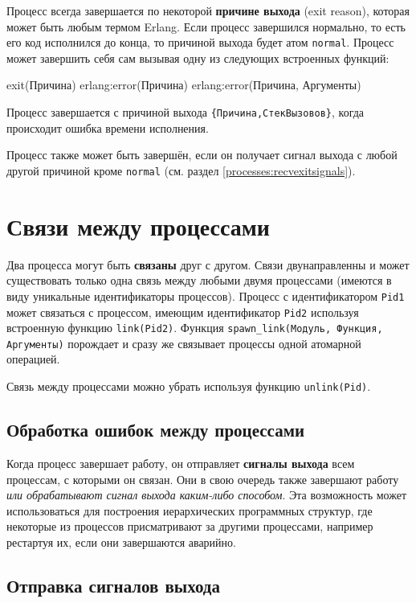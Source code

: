 Процесс всегда завершается по некоторой \textbf{причине выхода} (exit reason), 
которая может быть любым термом Erlang.  Если процесс завершился нормально, то 
есть его код исполнился до конца, то причиной выхода будет атом \texttt{normal}.
Процесс может завершить себя сам вызывая одну из следующих встроенных функций:

\begin{erlangru}
exit(Причина)
erlang:error(Причина)
erlang:error(Причина, Аргументы)
\end{erlangru}

Процесс завершается с причиной выхода \texttt{\{Причина,СтекВызовов\}}, когда 
происходит ошибка времени исполнения.

Процесс также может быть завершён, если он получает сигнал выхода с любой другой
причиной кроме \texttt{normal} (см. раздел \ref{processes:recvexitsignals}).


\section{Связи между процессами}
\label{processes:links}

Два процесса могут быть \textbf{связаны} друг с другом. Связи двунаправленны и
может существовать только одна связь между любыми двумя процессами (имеются в 
виду уникальные идентификаторы процессов). Процесс с идентификатором
\texttt{Pid1} может связаться с процессом, имеющим идентификатор \texttt{Pid2}
используя встроенную функцию \texttt{link(Pid2)}.  Функция
\texttt{spawn\_link(Модуль, Функция, Аргументы)} порождает и сразу же связывает
процессы одной атомарной операцией.

Связь между процессами можно убрать используя функцию \texttt{unlink(Pid)}.


\subsection{Обработка ошибок между процессами}

Когда процесс завершает работу, он отправляет \textbf{сигналы выхода} всем 
процессам, с которыми он связан.  Они в свою очередь также завершают работу 
\emph{или обрабатывают сигнал выхода каким-либо способом}. Эта возможность 
может использоваться для построения иерархических программных структур, где
некоторые из процессов присматривают за другими процессами, например рестартуя 
их, если они завершаются аварийно.


\subsection{Отправка сигналов выхода}
\label{processes:sendexitsignals}

